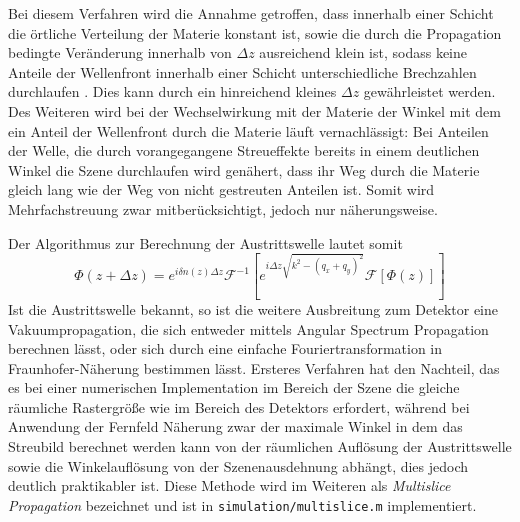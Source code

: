 Bei diesem Verfahren wird die Annahme getroffen, dass  innerhalb einer Schicht die örtliche Verteilung der Materie konstant ist, sowie die durch die Propagation bedingte Veränderung innerhalb von $\Delta z$ ausreichend klein ist, sodass keine Anteile der Wellenfront innerhalb einer Schicht unterschiedliche Brechzahlen durchlaufen \cite{hare1994}. Dies kann durch ein hinreichend kleines $\Delta z$ gewährleistet werden. 
Des Weiteren wird bei der Wechselwirkung mit der Materie der Winkel mit dem ein Anteil der Wellenfront durch die Materie läuft vernachlässigt: Bei Anteilen der Welle, die durch vorangegangene Streueffekte bereits in einem deutlichen Winkel die Szene durchlaufen wird genähert, dass ihr Weg durch die Materie gleich lang wie der Weg von nicht gestreuten Anteilen ist. Somit wird Mehrfachstreuung zwar mitberücksichtigt, jedoch nur näherungsweise.
	
Der Algorithmus zur Berechnung der Austrittswelle lautet somit
\begin{equation}
	\label{eq:multislice}
	\Phi(z+\Delta z)= e^{i\delta n\left(z\right) \Delta z}\mathscr{F}^{-1}\left[e^{i\Delta z\sqrt{k^2-(q_x+q_y)^2}}\mathscr{F}\left[\Phi(z)\right]\right]
\end{equation}
Ist die Austrittswelle bekannt, so ist die weitere Ausbreitung zum Detektor eine Vakuumpropagation, die sich entweder mittels Angular Spectrum Propagation berechnen lässt, oder sich durch eine einfache Fouriertransformation in Fraunhofer-Näherung bestimmen lässt. Ersteres Verfahren hat den Nachteil, das es bei einer numerischen Implementation im Bereich der Szene die gleiche räumliche Rastergröße wie im Bereich des Detektors erfordert, während bei Anwendung der Fernfeld Näherung zwar der maximale Winkel in dem das Streubild berechnet werden kann von der räumlichen Auflösung der Austrittswelle sowie die Winkelauflösung von der Szenenausdehnung abhängt, dies jedoch deutlich praktikabler ist.
Diese Methode wird im Weiteren als \textit{Multislice Propagation} bezeichnet und ist in \texttt{simulation/multislice.m} implementiert.
	
